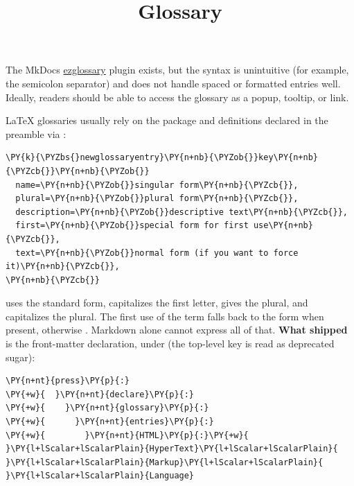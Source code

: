 \documentclass[a4paper,twoside]{article}
\title{Glossary}
\author{}\date{}
\begin{document}
\maketitle
The MkDocs \href{https://realtimeprojects.github.io/mkdocs-ezglossary}{ezglossary} plugin exists, but the syntax is unintuitive (for example, the semicolon separator) and does not handle spaced or formatted entries well. Ideally, readers should be able to access the glossary as a popup, tooltip, or link.

\LaTeX{} glossaries usually rely on the  package and definitions declared in the preamble via :
\begin{tscode}[lang=latex, engine=pygments]
\begin{Verbatim}[commandchars=\\\{\},breaklines, breakanywhere, commandchars=\\\{\}]
\PY{k}{\PYZbs{}newglossaryentry}\PY{n+nb}{\PYZob{}}key\PY{n+nb}{\PYZcb{}}\PY{n+nb}{\PYZob{}}
  name=\PY{n+nb}{\PYZob{}}singular form\PY{n+nb}{\PYZcb{}},
  plural=\PY{n+nb}{\PYZob{}}plural form\PY{n+nb}{\PYZcb{}},
  description=\PY{n+nb}{\PYZob{}}descriptive text\PY{n+nb}{\PYZcb{}},
  first=\PY{n+nb}{\PYZob{}}special form for first use\PY{n+nb}{\PYZcb{}},
  text=\PY{n+nb}{\PYZob{}}normal form (if you want to force it)\PY{n+nb}{\PYZcb{}},
\PY{n+nb}{\PYZcb{}}
\end{Verbatim}
\end{tscode}
 uses the standard form,  capitalizes the first letter,  gives the plural, and  capitalizes the plural. The first use of the term falls back to the  form when present, otherwise . Markdown alone cannot express all of that. \textbf{What shipped} is the front-matter
declaration, under  (the top-level  key is
read as deprecated sugar):
\begin{tscode}[lang=yml, engine=pygments]
\begin{Verbatim}[commandchars=\\\{\},breaklines, breakanywhere, commandchars=\\\{\}]
\PY{n+nt}{press}\PY{p}{:}
\PY{+w}{  }\PY{n+nt}{declare}\PY{p}{:}
\PY{+w}{    }\PY{n+nt}{glossary}\PY{p}{:}
\PY{+w}{      }\PY{n+nt}{entries}\PY{p}{:}
\PY{+w}{        }\PY{n+nt}{HTML}\PY{p}{:}\PY{+w}{ }\PY{l+lScalar+lScalarPlain}{HyperText}\PY{l+lScalar+lScalarPlain}{ }\PY{l+lScalar+lScalarPlain}{Markup}\PY{l+lScalar+lScalarPlain}{ }\PY{l+lScalar+lScalarPlain}{Language}
\end{Verbatim}
\end{tscode}
\end{document}
